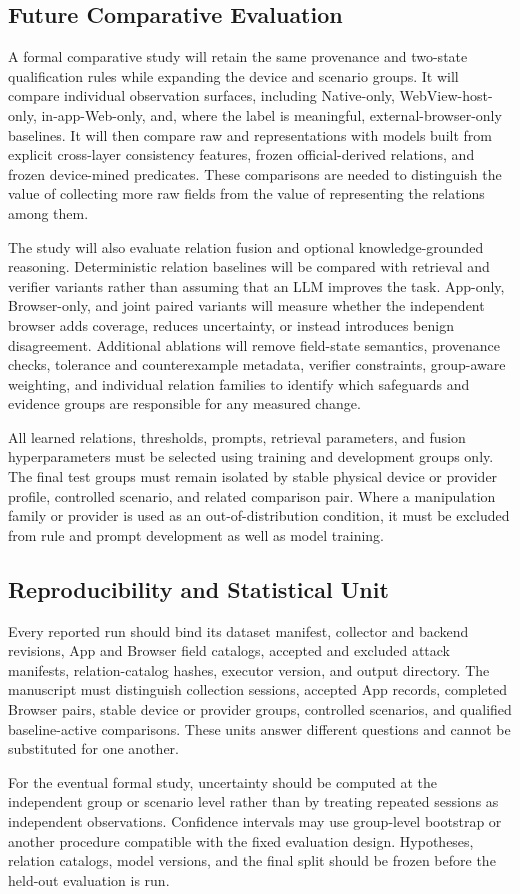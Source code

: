 \subsection{Future Comparative Evaluation}

A formal comparative study will retain the same provenance and two-state qualification rules while expanding the device and scenario groups. It will compare individual observation surfaces, including Native-only, WebView-host-only, in-app-Web-only, and, where the label is meaningful, external-browser-only baselines. It will then compare raw \appfp and \pairedfp representations with models built from explicit cross-layer consistency features, frozen official-derived relations, and frozen device-mined predicates. These comparisons are needed to distinguish the value of collecting more raw fields from the value of representing the relations among them.

The study will also evaluate relation fusion and optional knowledge-grounded reasoning. Deterministic relation baselines will be compared with retrieval and verifier variants rather than assuming that an LLM improves the task. App-only, Browser-only, and joint paired variants will measure whether the independent browser adds coverage, reduces uncertainty, or instead introduces benign disagreement. Additional ablations will remove field-state semantics, provenance checks, tolerance and counterexample metadata, verifier constraints, group-aware weighting, and individual relation families to identify which safeguards and evidence groups are responsible for any measured change.

All learned relations, thresholds, prompts, retrieval parameters, and fusion hyperparameters must be selected using training and development groups only. The final test groups must remain isolated by stable physical device or provider profile, controlled scenario, and related comparison pair. Where a manipulation family or provider is used as an out-of-distribution condition, it must be excluded from rule and prompt development as well as model training.

\subsection{Reproducibility and Statistical Unit}

Every reported run should bind its dataset manifest, collector and backend revisions, App and Browser field catalogs, accepted and excluded attack manifests, relation-catalog hashes, executor version, and output directory. The manuscript must distinguish collection sessions, accepted App records, completed Browser pairs, stable device or provider groups, controlled scenarios, and qualified baseline-active comparisons. These units answer different questions and cannot be substituted for one another.

For the eventual formal study, uncertainty should be computed at the independent group or scenario level rather than by treating repeated sessions as independent observations. Confidence intervals may use group-level bootstrap or another procedure compatible with the fixed evaluation design. Hypotheses, relation catalogs, model versions, and the final split should be frozen before the held-out evaluation is run.
